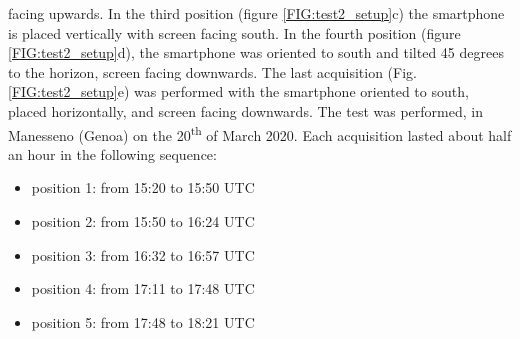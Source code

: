 facing upwards. In the third position (figure \ref{FIG:test2_setup}c) the smartphone is placed vertically with 
screen facing south. In the fourth position (figure \ref{FIG:test2_setup}d), the smartphone was oriented to  south and 
tilted 45 degrees to the horizon,  screen facing downwards. 
The last acquisition (Fig. \ref{FIG:test2_setup}e) was performed with the smartphone oriented to  south, 
placed horizontally, and screen facing downwards. 
The test was performed, in Manesseno (Genoa) on the 20\textsuperscript{th} of March 2020. 
Each acquisition lasted about half an hour in the following sequence:
\begin{itemize}
    \item position 1: from 15:20 to 15:50 UTC
    \item position 2: from 15:50 to 16:24 UTC
    \item position 3: from 16:32 to 16:57 UTC
    \item position 4: from 17:11 to 17:48 UTC
    \item position 5: from 17:48 to 18:21 UTC
\end{itemize}

